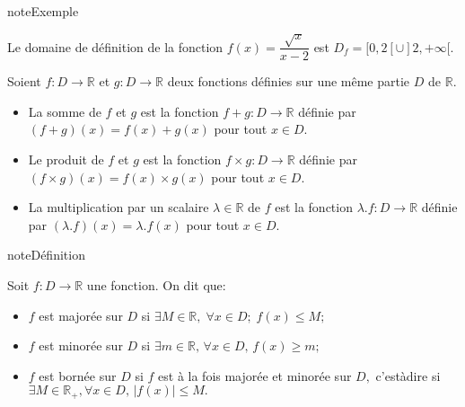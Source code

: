 \documentclass[letterpaper,10pt,french]{jupyterBook}
\begin{document}
\begin{sphinxadmonition}{note}{Exemple}

\sphinxAtStartPar
Le domaine de définition de la fonction \(f(x)=\dfrac{\sqrt{x}}{x-2}\) est \(D_f=[0,2[\cup]2,+\infty[.\)
\end{sphinxadmonition}

\sphinxAtStartPar
Soient \(f:D\rightarrow \mathbb{R}\) et \(g:D\rightarrow\mathbb{R}\) deux fonctions définies sur une même partie \(D\) de \(\mathbb{R}.\)
\begin{itemize}
\item {} 
\sphinxAtStartPar
La somme de \(f\) et \(g\) est la fonction \(f+g:D\rightarrow \mathbb{R}\) définie par \((f+g)(x)=f(x)+g(x)\) pour tout \(x\in D.\)

\item {} 
\sphinxAtStartPar
Le produit de \(f\) et \(g\) est la fonction \(f\times g:D\rightarrow \mathbb{R}\) définie par \((f\times g)(x)=f(x)\times g(x)\) pour tout \(x\in D.\)

\item {} 
\sphinxAtStartPar
La multiplication par un scalaire \(\lambda\in \mathbb{R}\) de \(f\) est la fonction \(\lambda.f:D\rightarrow \mathbb{R}\) définie par \((\lambda.f)(x)=\lambda.f(x)\) pour tout \(x\in D.\)

\end{itemize}

\begin{sphinxadmonition}{note}{Définition}

\sphinxAtStartPar
Soit \(f:D\rightarrow \mathbb{R}\) une fonction. On dit que:
\begin{itemize}
\item {} 
\sphinxAtStartPar
\(f\) est majorée sur \(D\) si \(\exists M\in \mathbb{R},\;\forall x\in D;\; f(x)\leq M;\)

\item {} 
\sphinxAtStartPar
\(f\) est minorée sur \(D\) si \(\exists m\in \mathbb{R},\,\forall x\in D,\, f(x)\geq m;\)

\item {} 
\sphinxAtStartPar
\(f\) est bornée sur \(D\) si \(f\) est à la fois majorée et minorée sur \(D,\) c’est\sphinxhyphen{}à\sphinxhyphen{}dire si \(\exists M\in \mathbb{R}_{+},\forall x\in D,\,|f(x)|\leq M.\)

\end{itemize}
\end{sphinxadmonition}
\end{document}
